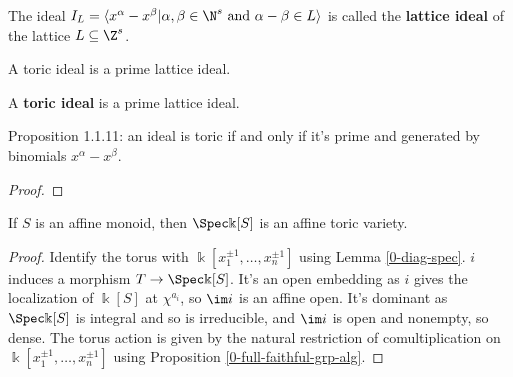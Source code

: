 \begin{definition}
  \label{1-1-10-lat-ideal}
  \uses{}
  \leanok

  The ideal $I_L = \langle x^\alpha - x^\beta | \alpha, \beta \in \N^s \text{ and } \alpha - \beta \in L\rangle$ is called the {\bf lattice ideal} of the lattice $L \subseteq \Z^s$.

  A toric ideal is a prime lattice ideal.
\end{definition}


\begin{definition}
  \label{1-1-10-toric-ideal}
  \leanok
  A {\bf toric ideal} is a prime lattice ideal.
\end{definition}


\begin{proposition}
  \label{1-1-11-toric-ideal-gen-binomial}

  Proposition 1.1.11: an ideal is toric if and only if it's prime and generated by binomials $x^\alpha - x^\beta$.
\end{proposition}
\begin{proof}

\end{proof}


\begin{proposition}
  \label{1-1-14-aff-tor-var-spec-aff-mon-alg}
  \leanok

  If $S$ is an affine monoid, then $\Spec \Bbbk[S]$ is an affine toric variety.
\end{proposition}
\begin{proof}

  Identify the torus with $\Bbbk[x_1^{\pm1}, \dotsc, x_n^{\pm1}]$ using Lemma \ref{0-diag-spec}.
  $i$ induces a morphism $T \to \Spec \Bbbk[S]$. It's an open embedding as $i$ gives the localization of $\Bbbk[S]$ at $\chi^{a_i}$, so $\im i$ is an affine open. It's dominant as $\Spec \Bbbk[S]$ is integral and so is irreducible, and $\im i$ is open and nonempty, so dense. The torus action is given by the natural restriction of comultiplication on $\Bbbk[x_1^{\pm1}, \dotsc, x_n^{\pm1}]$ using Proposition \ref{0-full-faithful-grp-alg}.
\end{proof}


